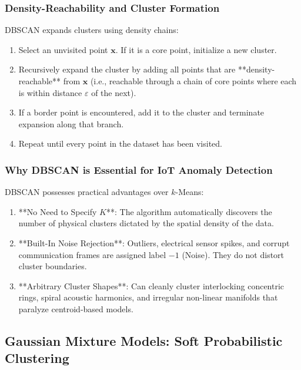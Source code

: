 \subsubsection{Density-Reachability and Cluster Formation}
DBSCAN expands clusters using density chains:
\begin{enumerate}
    \item Select an unvisited point $\mathbf{x}$. If it is a core point, initialize a new cluster.
    \item Recursively expand the cluster by adding all points that are **density-reachable** from $\mathbf{x}$ (i.e., reachable through a chain of core points where each is within distance $\varepsilon$ of the next).
    \item If a border point is encountered, add it to the cluster and terminate expansion along that branch.
    \item Repeat until every point in the dataset has been visited.
\end{enumerate}

\subsubsection{Why DBSCAN is Essential for IoT Anomaly Detection}
DBSCAN possesses practical advantages over $k$-Means:
\begin{enumerate}
    \item **No Need to Specify $K$**: The algorithm automatically discovers the number of physical clusters dictated by the spatial density of the data.
    \item **Built-In Noise Rejection**: Outliers, electrical sensor spikes, and corrupt communication frames are assigned label $-1$ (Noise). They do not distort cluster boundaries.
    \item **Arbitrary Cluster Shapes**: Can cleanly cluster interlocking concentric rings, spiral acoustic harmonics, and irregular non-linear manifolds that paralyze centroid-based models.
\end{enumerate}

\subsection{Gaussian Mixture Models: Soft Probabilistic Clustering}\label{subsec:gmm}


